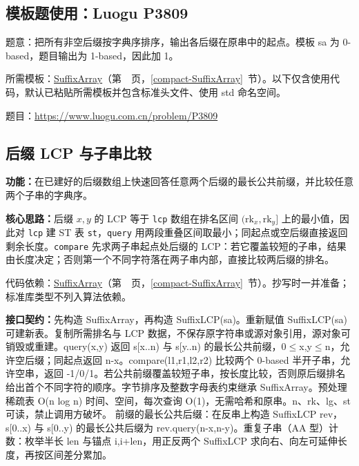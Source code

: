 \Needspace{440pt}



\newpage



\newpage

\Needspace{271pt}

\subsection*{模板题使用：Luogu P3809}

\label{usage-example-19}

题意：把所有非空后缀按字典序排序，输出各后缀在原串中的起点。模板 sa 为 0-based，题目输出为 1-based，因此加 1。

所需模板：\hyperref[compact-SuffixArray]{SuffixArray}（第~\pageref{compact-SuffixArray}~页，\ref{compact-SuffixArray}~节）。以下仅含使用代码，默认已粘贴所需模板并包含标准头文件、使用 std 命名空间。

题目：\url{https://www.luogu.com.cn/problem/P3809}



\subsection{后缀 LCP 与子串比较}\label{compact-SuffixLCP}

\noindent\textbf{功能：}\allowbreak 在已建好的后缀数组上快速回答任意两个后缀的最长公共前缀，并比较任意两个子串的字典序。

\textbf{核心思路：}\allowbreak 后缀 $x,y$ 的 LCP 等于 \texttt{lcp} 数组在排名区间 $(\mathrm{rk}_x,\mathrm{rk}_y]$ 上的最小值，因此对 \texttt{lcp} 建 ST 表 \texttt{st}，\texttt{query} 用两段重叠区间取最小；同起点或空后缀直接返回剩余长度。\texttt{compare} 先求两子串起点处后缀的 LCP：若它覆盖较短的子串，结果由长度决定；否则第一个不同字符落在两子串内部，直接比较两后缀的排名。

代码依赖：\hyperref[compact-SuffixArray]{SuffixArray}（第~\pageref{compact-SuffixArray}~页，\ref{compact-SuffixArray}~节）。抄写时一并准备；标准库类型不列入算法依赖。

{\sloppy{}\noindent\textbf{接口契约：}先构造 SuffixArray，再构造 SuffixLCP(sa)。重新赋值 SuffixLCP(sa) 可建新表。复制所需排名与 LCP 数据，不保存原字符串或源对象引用，源对象可销毁或重建。query(x,y) 返回 s[x..n) 与 s[y..n) 的最长公共前缀，0$\le$x,y$\le$n，允许空后缀；同起点返回 n-x。compare(l1,r1,l2,r2) 比较两个 0-based 半开子串，允许空串，返回 -1/0/1。若公共前缀覆盖较短子串，按长度比较，否则原后缀排名给出首个不同字符的顺序。字节排序及整数字母表约束继承 SuffixArray。预处理稀疏表 O(n log n) 时间、空间，每次查询 O(1)，无需哈希和原串。n、rk、lg、st 可读，禁止调用方破坏。 前缀的最长公共后缀：在反串上构造 SuffixLCP rev，s[0..x) 与 s[0..y) 的最长公共后缀为 rev.query(n-x,n-y)。重复子串（AA 型）计数：枚举半长 len 与锚点 i,i+len，用正反两个 SuffixLCP 求向右、向左可延伸长度，再按区间差分累加。\par}

